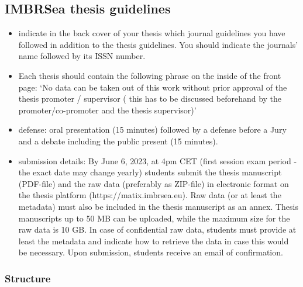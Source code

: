 \documentclass[
  authoryear,
  review,
  3p]{elsarticle}
\providecommand{\tightlist}{%
  \setlength{\itemsep}{0pt}\setlength{\parskip}{0pt}}\usepackage{longtable,booktabs,array}
\begin{document}
\hypertarget{imbrsea-thesis-guidelines}{%
\subsection*{IMBRSea thesis
guidelines}\label{imbrsea-thesis-guidelines}}

\begin{itemize}
\tightlist
\item
  indicate in the back cover of your thesis which journal guidelines you
  have followed in addition to the thesis guidelines. You should
  indicate the journals' name followed by its ISSN number.
\item
  Each thesis should contain the following phrase on the inside of the
  front page: `No data can be taken out of this work without prior
  approval of the thesis promoter / supervisor ( this has to be
  discussed beforehand by the promoter/co-promoter and the thesis
  supervisor)'
\item
  defense: oral presentation (15 minutes) followed by a defense before a
  Jury and a debate including the public present (15 minutes).
\item
  submission details: By June 6, 2023, at 4pm CET (first session exam
  period - the exact date may change yearly) students submit the thesis
  manuscript (PDF-file) and the raw data (preferably as ZIP-file) in
  electronic format on the thesis platform (https://matix.imbrsea.eu).
  Raw data (or at least the metadata) must also be included in the
  thesis manuscript as an annex. Thesis manuscripts up to 50 MB can be
  uploaded, while the maximum size for the raw data is 10 GB. In case of
  confidential raw data, students must provide at least the metadata and
  indicate how to retrieve the data in case this would be necessary.
  Upon submission, students receive an email of confirmation.
\end{itemize}

\hypertarget{structure}{%
\subsubsection*{Structure}\label{structure}}
\end{document}
